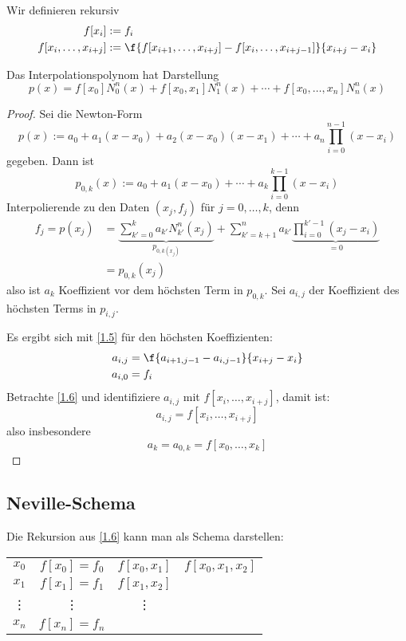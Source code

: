\documentclass[11pt]{scrbook}
\begin{document}
\begin{df}
	\label{1.6}
	Wir definieren rekursiv
	\begin{align*}
		f[x_i] &:= f_i\\
		f[x_i,\dotsc,x_{i+j}] &:= \f {f[x_{i+1},\dotsc,x_{i+j}] - f[x_i,\dotsc,x_{i+j-1}]}{x_{i+j}-x_i}
	\end{align*}
\end{df}

\begin{st}
	\label{1.7}
	Das Interpolationspolynom hat Darstellung
	\[
		p(x) = f[x_0]N_0^n(x) + f[x_0,x_1]N_1^n(x) + \dotsb + f[x_0,\dotsc,x_n]N_n^n(x)
	\]
	\begin{proof}
		Sei die Newton-Form
		\[
			p(x) := a_0 + a_1(x-x_0) + a_2(x-x_0)(x-x_1) + \dotsb + a_n\prod_{i=0}^{n-1}(x-x_i)
		\]
		gegeben.
		Dann ist
		\[
			p_{0,k}(x) := a_0 + a_1(x-x_0) + \dotsb + a_k\prod_{i=0}^{k-1}(x-x_i)
		\]
		Interpolierende zu den Daten $(x_j,f_j)$ für $j=0,\dotsc,k$, denn
		\begin{align*}
			f_j = p(x_j) &= \underbrace{\sum_{k'=0}^ka_{k'}N_{k'}^n(x_j)}_{p_{0,k(x_j)}} + \sum_{k'=k+1}^n a_{k'}\underbrace{\prod_{i=0}^{k'-1}(x_j-x_i)}_{=0}\\
			&= p_{0,k}(x_j)
		\end{align*}
		also ist $a_k$ Koeffizient vor dem höchsten Term in $p_{0,k}$.
		Sei $a_{i,j}$ der Koeffizient des höchsten Terms in $p_{i,j}$.

		Es ergibt sich mit \ref{1.5} für den höchsten Koeffizienten:
		\begin{align*}
			a_{i,j} &= \f {a_{i+1,j-1} - a_{i,j-1}}{x_{i+j}-x_i}\\
			a_{i,0} &= f_i
		\end{align*}
		Betrachte \ref{1.6} und identifiziere $a_{i,j}$ mit $f[x_i,\dotsc,x_{i+j}]$, damit ist:
		\[
			a_{i,j} = f[x_i,\dotsc, x_{i+j}]
		\]
		also insbesondere
		\[
			a_k = a_{0,k} = f[x_0,\dotsc, x_k]
		\]
	\end{proof}
\end{st}

\subsection{Neville-Schema}

Die Rekursion aus \ref{1.6} kann man als Schema darstellen:

\begin{table}[H]
	\centering
	\begin{tabular}{cccc}
	$x_0$ & $f[x_0]=f_0$ & $f[x_0,x_1]$ & $f[x_0,x_1,x_2]$ \\
	$x_1$ & $f[x_1]=f_1$ & $f[x_1,x_2]$ &  \\
	\vdots & \vdots & \vdots\\
	$x_n$ & $f[x_n]=f_n$ &\\
	\end{tabular}
\end{table}
\end{document}

